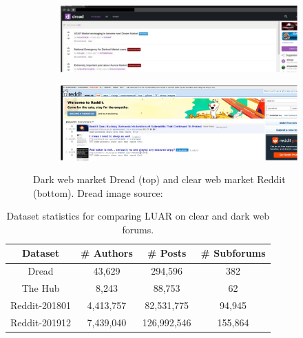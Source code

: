 \begin{figure}
    \centering
    \begin{subfigure}{0.9\linewidth}
       \includegraphics[width=\textwidth]{stylometryExtensions/figures/Dread} 
    \end{subfigure}
    \begin{subfigure}{0.9\linewidth}
       \includegraphics[width=\textwidth]{stylometryExtensions/figures/Reddit} 
    \end{subfigure}
    \caption{Dark web market Dread (top) and clear web market Reddit (bottom). Dread image source:~\citet{wiki:Dread}}
    \label{fig:stylometry_extensions:followingTrail:forums}
\end{figure}

\begin{table}
    \centering
    \begin{tabular}{cccc}
        \toprule
        Dataset &  \# Authors & \# Posts & \# Subforums\\
        \midrule
        Dread & 43,629 & 294,596 & 382 \\
        The Hub & 8,243 & 88,753 & 62 \\
        Reddit-201801 & 4,413,757 & 82,531,775 & 94,945 \\
        Reddit-201912 & 7,439,040 & 126,992,546 & 155,864 \\
        \bottomrule
    \end{tabular}
    \caption{Dataset statistics for comparing LUAR on clear and dark web forums.}
    \label{tab:stylometry_extensions:followingTrail:datasets}
\end{table}

